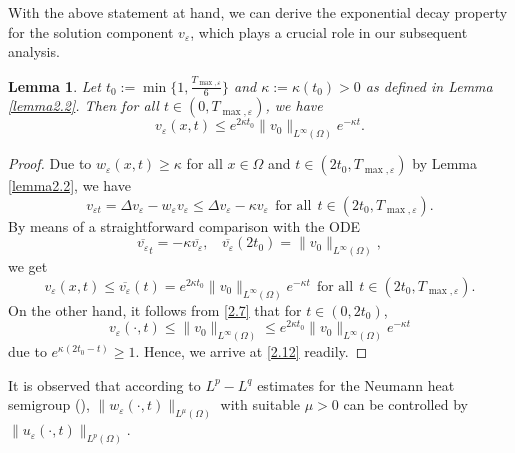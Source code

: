 \documentclass[12pt]{article}
\theoremstyle{plain}
\newtheorem{lemma}{Lemma}[section]
\theoremstyle{definition}
\numberwithin{equation}{section}
\begin{document}
With the above statement at hand, we can derive the exponential decay property for the solution component $v_\varepsilon$, which plays a crucial role in our subsequent analysis.
\begin{lemma}\label{lemma2.3}
Let
$t_0:=\min\{1,\frac{T_{\max,\varepsilon}}{6}\}$ and $\kappa:=\kappa(t_0)>0$ as defined in Lemma \ref{lemma2.2}. Then for all $t\in(0,T_{\max,\varepsilon})$, we have
\begin{equation}\label{2.12}
v_\varepsilon(x,t)\leq e^{2\kappa t_0}\|v_0\|_{L^{\infty}(\Omega)}e^{-\kappa t}.
\end{equation}
\end{lemma}
\begin{proof}
Due to $w_\varepsilon(x,t)\geq\kappa$ for all $x\in\Omega$ and $t\in(2t_0,T_{\max,\varepsilon})$ by Lemma \ref{lemma2.2}, we have
$$v_{\varepsilon t}=\Delta v_\varepsilon-w_\varepsilon v_\varepsilon\leq\Delta v_\varepsilon-\kappa v_\varepsilon~~\mbox{for all}~~t\in(2t_0,T_{\max,\varepsilon}).$$
By means of a straightforward comparison with the ODE
$$\overline{v_{\varepsilon}}_t=-\kappa \overline{v_\varepsilon},~~~~\overline{v_\varepsilon}(2t_0)=\|v_0\|_{L^\infty(\Omega)},$$
we get
$$v_\varepsilon(x,t)\leq \overline{v_\varepsilon}(t)=%
e^{2\kappa t_0}\|v_0\|_{L^\infty(\Omega)}e^{-\kappa t}~~\mbox{for all}~~t\in(2t_0,T_{\max,\varepsilon}).$$
 On the other hand, it follows from  \eqref{2.7} that for $t\in(0,2t_0)$,
\begin{equation*}
v_\varepsilon(\cdot,t)\leq\|v_0\|_{L^{\infty}(\Omega)}\leq e^{2\kappa t_0}\|v_0\|_{L^{\infty}(\Omega)}e^{-\kappa t}
\end{equation*}
due to $e^{\kappa(2t_0-t)}\geq1$.
Hence, we arrive at \eqref{2.12} readily.
\end{proof}
It is observed  that according to  $L^p-L^q$ estimates for the Neumann heat semigroup (\cite{Winkler(2010)}), $ \|w_\varepsilon(\cdot,t)\|_{L^{\mu}(\Omega)}$ with suitable $\mu>0$ can be controlled by $\|u_\varepsilon(\cdot,t)\|_{L^p(\Omega)}$.
\end{document}
